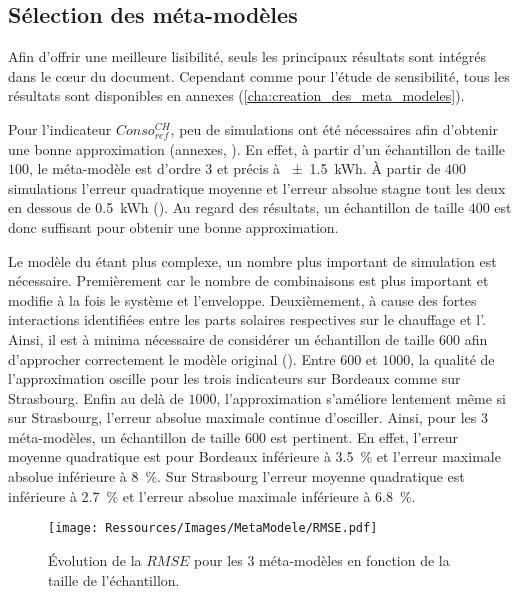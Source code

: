 \subsection{Sélection des méta-modèles} %
\label{sub:selection_des_meta_modeles}
Afin d’offrir une meilleure lisibilité, seuls les principaux résultats sont intégrés dans
le cœur du document. Cependant comme pour l’étude de sensibilité, tous
les résultats sont disponibles en annexes (\ref{cha:creation_des_meta_modeles}).

Pour l’indicateur $Conso_{ref}^{CH}$, peu de simulations ont été nécessaires afin
d’obtenir une bonne approximation (annexes, ). En effet,
à partir d’un échantillon de taille $100$, le méta-modèle est d’ordre $3$ et précis à
\SI{+- 1.5}{kWh}. À partir de $400$ simulations l’erreur quadratique moyenne et l’erreur
absolue stagne tout les deux en dessous de \SI{0.5}{kWh} ().
Au regard des résultats, un échantillon de taille $400$ est donc suffisant pour obtenir
une bonne approximation.

Le modèle du  étant plus complexe, un nombre plus important de simulation est
nécessaire. Premièrement car le nombre de combinaisons est plus important et modifie à la
fois le système et l’enveloppe. Deuxièmement, à cause des fortes interactions identifiées
entre les parts solaires respectives sur le chauffage et l’. Ainsi, il est à
minima nécessaire de considérer un échantillon de taille $600$ afin d’approcher
correctement le modèle original ().
Entre $600$ et $1000$, la qualité de l’approximation oscille pour les trois indicateurs
sur Bordeaux comme sur Strasbourg. Enfin au delà de $1000$, l’approximation s’améliore
lentement même si sur Strasbourg, l’erreur absolue maximale continue d’osciller. Ainsi,
pour les $3$ méta-modèles, un échantillon de taille $600$ est pertinent. En effet,
l’erreur moyenne quadratique est pour Bordeaux inférieure à
\SI{3.5}{\percent} et l’erreur maximale absolue inférieure à \SI{8}{\percent}. Sur
Strasbourg l’erreur moyenne quadratique est inférieure à
\SI{2.7}{\percent} et l’erreur absolue maximale inférieure à \SI{6.8}{\percent}.


\begin{figure}
    \centering
    \texttt{[image: Ressources/Images/MetaModele/RMSE.pdf]}
    \caption[Évolution de la $RMSE$ en fonction de l’échantillon]
            {Évolution de la $RMSE$ pour les \num{3} méta-modèles
             en fonction de la taille de l’échantillon.}
    \label{fig:rmse_mae}
\end{figure}

